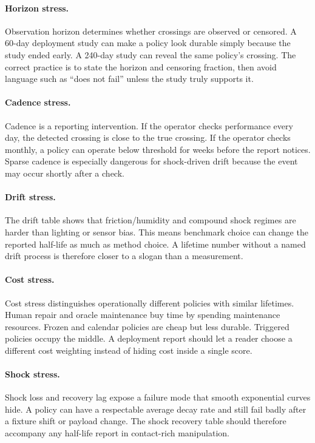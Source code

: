 \documentclass{article}
\begin{document}
\paragraph{Horizon stress.}
Observation horizon determines whether crossings are observed or censored. A
60-day deployment study can make a policy look durable simply because the study
ended early. A 240-day study can reveal the same policy's crossing. The correct
practice is to state the horizon and censoring fraction, then avoid language
such as ``does not fail'' unless the study truly supports it.

\paragraph{Cadence stress.}
Cadence is a reporting intervention. If the operator checks performance every
day, the detected crossing is close to the true crossing. If the operator checks
monthly, a policy can operate below threshold for weeks before the report
notices. Sparse cadence is especially dangerous for shock-driven drift because
the event may occur shortly after a check.

\paragraph{Drift stress.}
The drift table shows that friction/humidity and compound shock regimes are
harder than lighting or sensor bias. This means benchmark choice can change the
reported half-life as much as method choice. A lifetime number without a named
drift process is therefore closer to a slogan than a measurement.

\paragraph{Cost stress.}
Cost stress distinguishes operationally different policies with similar
lifetimes. Human repair and oracle maintenance buy time by spending maintenance
resources. Frozen and calendar policies are cheap but less durable. Triggered
policies occupy the middle. A deployment report should let a reader choose a
different cost weighting instead of hiding cost inside a single score.

\paragraph{Shock stress.}
Shock loss and recovery lag expose a failure mode that smooth exponential
curves hide. A policy can have a respectable average decay rate and still fail
badly after a fixture shift or payload change. The shock recovery table should
therefore accompany any half-life report in contact-rich manipulation.
\end{document}
